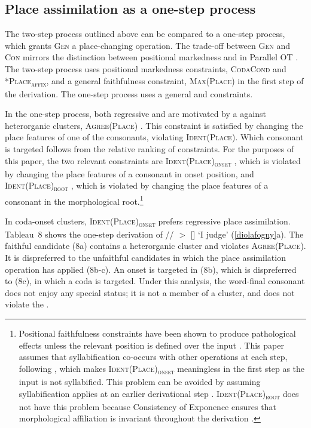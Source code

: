\documentclass[output=paper,modfonts,nonflat,hidelinks]{langsci/langscibook}
\begin{document}
\subsection{Place assimilation as a one-step process}

The two-step process outlined above can be compared to a one-step process, which grants \textsc{Gen} a place-changing operation. The trade-off between \textsc{Gen} and \textsc{Con} mirrors the distinction between positional markedness and  in Parallel OT \citep{zoll2004}. The two-step process uses positional markedness constraints, \textsc{CodaCond} and \textsc{*Place\textsubscript{affix}}, and a general faithfulness constraint, \textsc{Max(Place)} in the first step of the derivation. The one-step process uses a general  and  constraints.

In the one-step process, both regressive and  are motivated by a  against heterorganic clusters, \textsc{Agree(Place)} \citep{yip1991,lombardi1999,bakovic2000,bakovic2007}. This constraint is satisfied by changing the place features of one of the consonants, violating \textsc{Ident(Place)}. Which consonant is targeted follows from the relative ranking of  constraints. For the purposes of this paper, the two relevant constraints are \textsc{Ident(Place)\textsubscript{onset}} \citep{beckman1998}, which is violated by changing the place features of a consonant in onset position, and \textsc{Ident(Place)\textsubscript{root}} \citep{mccarthyprince1995}, which is violated by changing the place features of a consonant in the morphological root.\footnote{Positional faithfulness constraints have been shown to produce pathological effects unless the relevant position is defined over the input \citep{jesney2011}. This paper assumes that syllabification co-occurs with other operations at each step, following \citet{mccarthy2008}, which makes \textsc{Ident(Place)\textsubscript{onset}} meaningless in the first step as the input is not syllabified. This problem can be avoided by assuming syllabification applies at an earlier derivational step \citep{elfner2009}. \textsc{Ident(Place)\textsubscript{root}} does not have this problem because Consistency of Exponence ensures that morphological affiliation is invariant throughout the derivation \citep{mccarthyprince1993b}.}

In coda-onset clusters, \textsc{Ident(Place)\textsubscript{onset}} prefers regressive place assimilation. Tableau~8 shows the one-step derivation of // $>$ [] `I judge' (\ref{diolafogny}a). The faithful candidate (8a) contains a heterorganic cluster and violates \textsc{Agree(Place)}. It is dispreferred to the unfaithful candidates in which the place assimilation operation has applied (8b-c). An onset is targeted in (8b), which is dispreferred to (8c), in which a coda is targeted. Under this analysis, the word-final consonant does not enjoy any special status; it is not a member of a cluster, and does not violate the .
\end{document}
